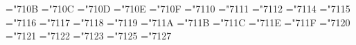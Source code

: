 \mathchardef\alpha="710B
\mathchardef\beta="710C
\mathchardef\gamma="710D
\mathchardef\delta="710E
\mathchardef\epsilon="710F
\mathchardef\zeta="7110
\mathchardef\eta="7111
\mathchardef\theta="7112
\mathchardef\kappa="7114
\mathchardef\lambda="7115
\mathchardef\mu="7116
\mathchardef\nu="7117
\mathchardef\xi="7118
\mathchardef\pi="7119
\mathchardef\rho="711A
\mathchardef\sigma="711B
\mathchardef\tau="711C
\mathchardef\phi="711E
\mathchardef\chi="711F
\mathchardef\psi="7120
\mathchardef\omega="7121
\mathchardef\varepsilon="7122
\mathchardef\vartheta="7123
\mathchardef\varrho="7125
\mathchardef\varphi="7127

\def\physgreek{
\mathchardef\Gamma="7100
\mathchardef\Delta="7101
\mathchardef\Theta="7102
\mathchardef\Lambda="7103
\mathchardef\Xi="7104
\mathchardef\Pi="7105
\mathchardef\Sigma="7106
\mathchardef\Upsilon="7107
\mathchardef\Phi="7108
\mathchardef\Psi="7109
\mathchardef\Omega="710A}


